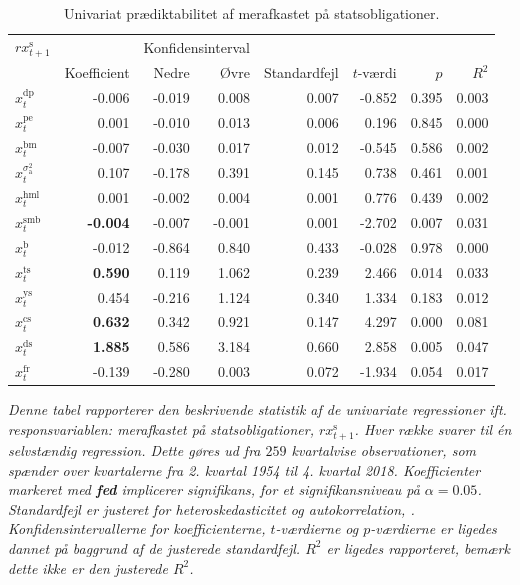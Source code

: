 \documentclass[
  a4paper,
  oneside]{memoir}
\begin{document}
\begin{table}[H]

\caption{\label{tab:UNI-s}Univariat prædiktabilitet af merafkastet på statsobligationer.}
\centering
\begin{threeparttable}
\begin{tabular}[t]{lrrrrrrr}
\toprule
\multicolumn{1}{c}{$rx_{t+1}^{\text{s}}$} & \multicolumn{1}{c}{ } & \multicolumn{2}{c}{Konfidensinterval} & \multicolumn{4}{c}{ } \\
\cmidrule(l{3pt}r{3pt}){1-1} \cmidrule(l{3pt}r{3pt}){3-4}
  & Koefficient & Nedre & Øvre & Standardfejl & $t$-værdi & $p$ & $R^2$\\
\midrule
\rowcolor{gray!6}  $x_t^{\text{dp}}$ & -0.006 & -0.019 & 0.008 & 0.007 & -0.852 & 0.395 & 0.003\\
$x_t^{\text{pe}}$ & 0.001 & -0.010 & 0.013 & 0.006 & 0.196 & 0.845 & 0.000\\
\rowcolor{gray!6}  $x_t^{\text{bm}}$ & -0.007 & -0.030 & 0.017 & 0.012 & -0.545 & 0.586 & 0.002\\
$x_t^{\sigma_{\text{a}}^2}$ & 0.107 & -0.178 & 0.391 & 0.145 & 0.738 & 0.461 & 0.001\\
\rowcolor{gray!6}  $x_t^{\text{hml}}$ & 0.001 & -0.002 & 0.004 & 0.001 & 0.776 & 0.439 & 0.002\\
$x_t^{\text{smb}}$ & \textbf{-0.004} & -0.007 & -0.001 & 0.001 & -2.702 & 0.007 & 0.031\\
\rowcolor{gray!6}  $x_t^{\text{b}}$ & -0.012 & -0.864 & 0.840 & 0.433 & -0.028 & 0.978 & 0.000\\
$x_t^{\text{ts}}$ & \textbf{ 0.590} & 0.119 & 1.062 & 0.239 & 2.466 & 0.014 & 0.033\\
\rowcolor{gray!6}  $x_t^{\text{ys}}$ & 0.454 & -0.216 & 1.124 & 0.340 & 1.334 & 0.183 & 0.012\\
$x_t^{\text{cs}}$ & \textbf{ 0.632} & 0.342 & 0.921 & 0.147 & 4.297 & 0.000 & 0.081\\
\rowcolor{gray!6}  $x_t^{\text{ds}}$ & \textbf{ 1.885} & 0.586 & 3.184 & 0.660 & 2.858 & 0.005 & 0.047\\
$x_t^{\text{fr}}$ & -0.139 & -0.280 & 0.003 & 0.072 & -1.934 & 0.054 & 0.017\\
\bottomrule
\end{tabular}
\begin{tablenotes}
\item \textit{Denne tabel rapporterer den beskrivende statistik af de univariate regressioner ift. responsvariablen: merafkastet på statsobligationer, $rx_{t+1}^{\text{s}}$. Hver række svarer til én selvstændig regression. Dette gøres ud fra $259$ kvartalvise observationer, som spænder over kvartalerne fra 2. kvartal 1954 til 4. kvartal 2018. Koefficienter markeret med \textbf{fed} implicerer signifikans, for et signifikansniveau på $\alpha=0.05$. Standardfejl er justeret for heteroskedasticitet og autokorrelation, \citep{Newey1987}. Konfidensintervallerne for koefficienterne, $t$-værdierne og $p$-værdierne er ligedes dannet på baggrund af de justerede standardfejl. $R^2$ er ligedes rapporteret, bemærk dette ikke er den justerede $R^2$.}
\end{tablenotes}
\end{threeparttable}
\end{table}
\end{document}
